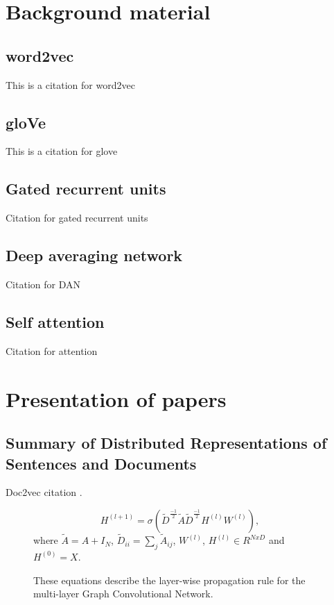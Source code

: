 \section{\label{sec:level3} Background material}

\subsection{word2vec}

This is a citation for word2vec \cite{word2vec}

\subsection{gloVe}

This is a citation for glove \cite{glove}

\subsection{Gated recurrent units}

Citation for gated recurrent units \cite{gru}

\subsection{Deep averaging network}

Citation for DAN \cite{dan}

\subsection{Self attention}

Citation for attention \cite{attention}

\section{\label{sec:level4} Presentation of papers}
\subsection{Summary of Distributed Representations of Sentences and Documents}
Doc2vec citation \cite{conf/icml/LeM14}.
\begin{figure}
\centering
$$H^{(l+1)} = \sigma (\widetilde{D}^{\frac{-1}{2}}\widetilde{A}\widetilde{D}^{\frac{-1}{2}}H^{(l)}W^{(l)}),$$ where $\widetilde{A} = A + I_N$, $\widetilde{D}_{ii} = \sum_{j}\widetilde{A}_{ij}$, $W^{(l)}$, $H^{(l)} \in R^{NxD}$ and $H^{(0)} = X$. 
\caption{These equations describe the layer-wise propagation rule for the multi-layer Graph Convolutional Network.}
\label{fig:gcn}
\end{figure}

